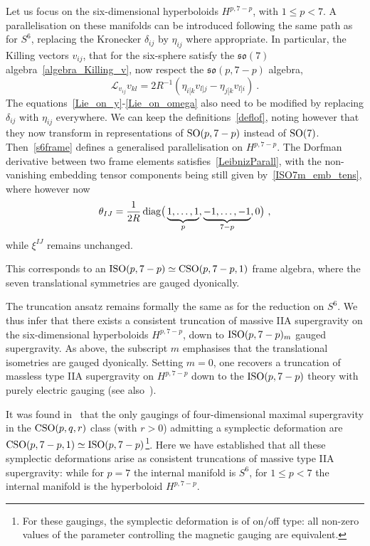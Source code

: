 \documentclass[debug]{phd}
\begin{document}
					Let us focus on the six-dimensional hyperboloids $H^{p,7-p}$, with $1\leq p < 7$.
					A parallelisation on these manifolds can be introduced following the same path as for $S^6$, replacing the Kronecker $\delta_{ij}$ by $\eta_{ij}$ where appropriate.
					In particular, the Killing vectors $v_{ij}$, that for the six-sphere satisfy the $\mathfrak{so}(7)$ algebra~\eqref{algebra_Killing_v}, now respect the $\mathfrak{so}(p,7-p)$ algebra,
							\begin{equation}
								\mathcal{L}_{v_{ij}} v_{kl} = 2R^{-1}\left(\eta_{i[k}v_{l]j} - \eta_{j[k}v_{l]i}\right)\ .
							\end{equation}
					The equations~\eqref{Lie_on_y}-\eqref{Lie_on_omega} also need to be modified by replacing $\delta_{ij}$ with $\eta_{ij}$ everywhere. 
					We can keep the definitions~\eqref{deflof}, noting however that they now transform in representations of $\mathrm{SO}(p,7-p)$ instead of $\mathrm{SO}(7)$.
					Then~\eqref{s6frame} defines a generalised parallelisation on $H^{p,7-p}$. 
					The Dorfman derivative between two frame elements satisfies~\eqref{LeibnizParall}, with the non-vanishing embedding tensor components being still given by~\eqref{ISO7m_emb_tens}, where however now
							\begin{equation}
								\theta_{IJ} = \frac{1}{2R} \,{\rm diag}\big(\underbrace{1,\ldots,1}_{p },\underbrace{-1,\ldots,-1}_{7-p },0\big)\ ,
							\end{equation}
					while $\xi^{IJ}$ remains unchanged.
					
					 This corresponds to an $\mathrm{ISO}(p,7-p)\simeq \mathrm{CSO}(p,7-p,1)$ frame algebra, where the seven translational symmetries are gauged dyonically.

					The truncation ansatz remains formally the same as for the reduction on $S^6$. 
					We thus infer that there exists a consistent truncation of massive IIA supergravity on the six-dimensional hyperboloids $H^{p,7-p}$, down to $\mathrm{ISO}(p,7-p)_m$ gauged supergravity. 
					As above, the subscript $m$ emphasises that the translational isometries are gauged dyonically. Setting $m=0$, one recovers a truncation of massless type IIA supergravity on $H^{p,7-p}$ down to the $\mathrm{ISO}(p,7-p)$ theory with purely electric gauging (see also~\cite{Hohm:2014qga}).

					It was found in~\cite{Dall'Agata:2012bb} that the only gaugings of four-dimensional maximal supergravity in the $\mathrm{CSO}(p,q,r)$ class (with $r >0$) admitting a symplectic deformation are $\mathrm{CSO}(p,7-p,1)\simeq \mathrm{ISO}(p,7-p)$\footnote{%
						For these gaugings, the symplectic deformation is of on/off type: all non-zero values of the parameter controlling the magnetic gauging are equivalent.%
						}.
					Here we have established that all these symplectic deformations arise as consistent truncations of massive type IIA supergravity: while for $p=7$ the internal manifold is $S^6$, for $1\leq p < 7 $ the internal manifold is the hyperboloid $H^{p,7-p}$.
\end{document}
